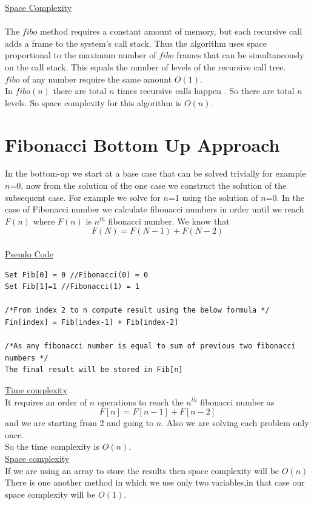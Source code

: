 \documentclass[12pt]{book}
\begin{document}
\underline{Space Complexity}\\\\
    The $fibo$ method requires a constant amount of memory, but each recursive call adds a frame to the system’s call stack. Thus the algorithm uses space proportional to the maximum number of $fibo$ frames that can be simultaneously on the call stack. This equals the number of levels of the recursive call tree.\\
$fibo$ of any number require the same amount $O(1)$.\\
In  $fibo(n)$ there are total $n$ times recursive calls happen . So there are total $n$ levels. So space complexity for this algorithm is $O(n)$.\\

\section{Fibonacci Bottom Up Approach}
	In the bottom-up we start at a base case that can be solved trivially for example $n$=0, now from the solution of the one case we construct the solution of the subsequent case. For example we solve for $n$=1 using the solution of $n$=0. In the case of Fibonacci number we calculate fibonacci numbers in order until we reach $F(n)$ where $F(n)$ is $n^{th}$ fibonacci number. We know that \[F(N)=F(N-1)+F(N-2)\]\\

\underline{Pseudo Code}\\
\begin{lstlisting}
Set Fib[0] = 0 //Fibonacci(0) = 0
Set Fib[1]=1 //Fibonacci(1) = 1

/*From index 2 to n compute result using the below formula */
Fin[index] = Fib[index-1] + Fib[index-2]

/*As any fibonacci number is equal to sum of previous two fibonacci numbers */
The final result will be stored in Fib[n]
\end{lstlisting}

\underline{Time complexity}\\
It requires an order of $n$ operations to reach the $n^{th}$ fibonacci number as \[F[n]=F[n-1]+F[n-2]\] and we are starting from 2 and going to $n$. Also we are solving each problem only once.\\
So the time complexity is $O(n)$.\\

\underline{Space complexity}\\
If we are using an array to store the results then space complexity will be $O(n)$\\
There is one another method in which we use only two variables,in that case our space complexity will be $O(1)$.\\
\end{document}
